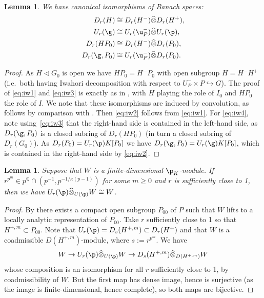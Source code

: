 \documentclass[a4paper]{amsart}
\numberwithin{equation}{section}
\newtheorem{lem}[thm]{Lemma}
\theoremstyle{remark}
\theoremstyle{definition}
\newcommand{\Q}{\mathbb{Q}}
\newcommand{\into}{\hookrightarrow}
\newcommand{\wh}[1]{\widehat{#1}}
\begin{document}
\begin{lem}\label{lm:iwahori-decomp}
  We have canonical isomorphisms of Banach spaces:  \begin{align}
    D_r(H) &\cong D_r(H^-) \wh\otimes D_r(H^+), \label{eq:iw1} \\
    U_r(\g) &\cong U_r(\u_P^-) \wh\otimes U_r(\p), \label{eq:iw2} \\
    D_r(HP_0) &\cong D_r(H^-) \wh\otimes D_r(P_0), \label{eq:iw3} \\
    D_r(\g,P_0) &\cong U_r(\u_P^-) \wh\otimes D_r(P_0). \label{eq:iw4}
  \end{align}
\end{lem}

\begin{proof}
  As $H \lhd G_0$ is open we have $HP_0 = H^- P_0$ with open subgroup $H = H^-H^+$ (i.e.\ both having Iwahori decomposition with respect to $U_P^- \times P \into G$).
  The proof of \eqref{eq:iw1} and \eqref{eq:iw3} is exactly as in \cite[Proposition 3.3.4]{OS}, with $H$ playing the role of $I_0$ and $HP_0$ the role of $I$.
  We note that these isomorphisms are induced by convolution, as follows by comparison with \cite[Remark A.4]{ST-duality}.
  Then \eqref{eq:iw2} follows from \eqref{eq:iw1}.
  For \eqref{eq:iw4}, note using~\eqref{eq:iw3} that the right-hand side is contained in the left-hand side, as $D_r(\g,P_0)$ is a closed subring of $D_r(HP_0)$ (in turn a closed subring of $D_r(G_0)$).
  As $D_r(P_0) = U_r(\p) K[P_0]$ we have $D_r(\g,P_0) = U_r(\g) K[P_0]$, which is contained in the right-hand side by \eqref{eq:iw2}.
\end{proof}

\begin{lem}\label{lm:U_r-p}
  Suppose that $W$ is a finite-dimensional $\p_K$-module.
  If $r^{p^m} \in p^{\Q} \cap (p^{-1},p^{-1/\kappa(p-1)})$ for some $m \ge 0$ and $r$ is sufficiently close to 1, then we have $U_r(\p) \wh\otimes_{U(\p)} W \cong W$.
\end{lem}

\begin{proof}
  By \cite[Proposition 18.17]{MR2810332} there exists a compact open subgroup $P_{00}$ of $P$ such that $W$ lifts to a locally analytic representation of $P_{00}$.
  Take $r$ sufficiently close to 1 so that $H^{+,m} \subset P_{00}$.
  Note that $U_r(\p) = D_s(H^{+,m}) \subset D_r(H^+)$ and that $W$ is a coadmissible $D(H^{+,m})$-module, where $s := r^{p^m}$.
  We have
  \begin{equation*}
    W \to U_r(\p) \wh\otimes_{U(\p)} W \to D_s(H^{+,m}) \wh\otimes_{D(H^{+,m})} W
  \end{equation*}
  whose composition is an isomorphism for all $r$ sufficiently close to 1, by coadmissibility of $W$. But the first map has
  dense image, hence is surjective (as the image is finite-dimensional, hence complete), 
  so both maps are bijective.
\end{proof}
\end{document}
